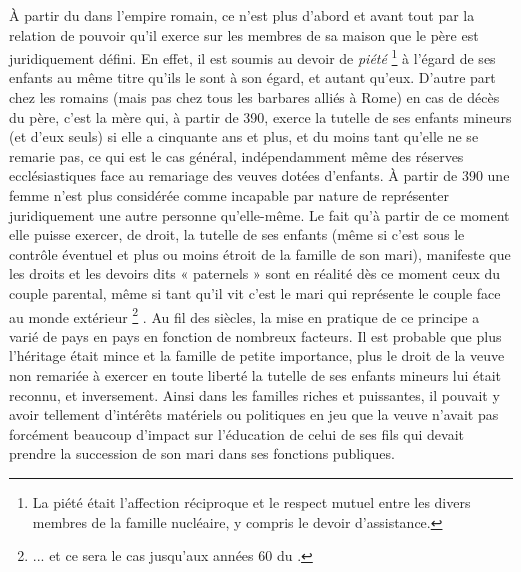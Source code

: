  À partir du  dans l'empire romain, ce n'est plus d'abord et avant tout par la relation de pouvoir qu'il exerce sur les membres de sa maison que le père est juridiquement défini. En effet, il est soumis au devoir de \emph{piété}%
\footnote{La piété était l'affection réciproque et le respect mutuel entre les divers membres de la famille nucléaire, y compris le devoir d'assistance.} 
à l'égard de ses enfants au même titre qu'ils le sont à son égard, et autant qu'eux. D'autre part chez les romains (mais pas chez tous les barbares alliés à Rome) en cas de décès du père, c'est la mère qui, à partir de 390, exerce la tutelle de ses enfants mineurs (et d'eux seuls) si elle a cinquante ans et plus, et du moins tant qu'elle ne se remarie pas, ce qui est le cas général, indépendamment même des réserves ecclésiastiques face au remariage des veuves dotées d'enfants. À partir de 390 une femme n'est plus considérée comme incapable par nature de représenter juridiquement une autre personne qu'elle-même. Le fait qu'à partir de ce moment elle puisse exercer, de droit, la tutelle de ses enfants (même si c'est sous le contrôle éventuel et plus ou moins étroit de la famille de son mari), manifeste que les droits et les devoirs dits « paternels » sont en réalité dès ce moment ceux du couple parental, même si tant qu'il vit c'est le mari qui représente le couple face au monde extérieur%
\footnote{... et ce sera le cas jusqu'aux années 60 du .}%
. Au fil des siècles, la mise en pratique de ce principe a varié de pays en pays en fonction de nombreux facteurs. Il est probable que plus l'héritage était mince et la famille de petite importance, plus le droit de la veuve non remariée à exercer en toute liberté la tutelle de ses enfants mineurs lui était reconnu, et inversement. Ainsi dans les familles riches et puissantes, il pouvait y avoir tellement d'intérêts matériels ou politiques en jeu que la veuve n'avait pas forcément beaucoup d'impact sur l'éducation de celui de ses fils qui devait prendre la succession de son mari dans ses fonctions publiques. 

